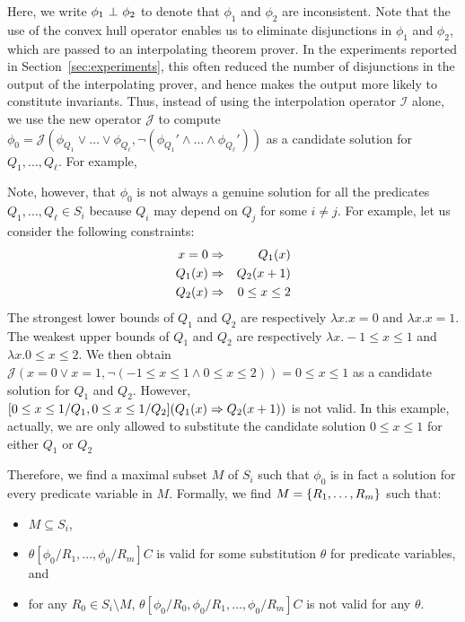 Here, we write \(\phi_1 \ \bot\  \phi_2\) to denote that \(\phi_1\) and 
\(\phi_2\) are inconsistent.  Note that the use of the convex hull 
operator enables us to eliminate disjunctions in \(\phi_1\) and 
\(\phi_2\), which are passed to an interpolating theorem prover.
In the experiments reported in Section~\ref{sec:experiments}, this often 
reduced the number of disjunctions in the output of the interpolating 
prover, and hence makes the output more likely to constitute invariants.
%
Thus, instead of using the interpolation operator \(\mathcal{I}\) alone, 
we use the new operator \(\mathcal{J}\) to compute \(\phi_0 = 
\mathcal{J}(\phi_{Q_1} \lor \dots \lor \phi_{Q_{\ell}},\neg (\phi_{Q_1}' 
\land \dots \land \phi_{Q_{\ell}}'))\) as a candidate solution for 
\(Q_1,\dots,Q_{\ell}\).  For example, \todo{}

Note, however, that \(\phi_0\) is not always a genuine solution for all 
the predicates \(Q_1,\dots,Q_{\ell} \in S_i\) because \(Q_i\) may depend 
on \(Q_j\) for some \(i \neq j\).  For example, let us consider the 
following constraints:
\begin{eqnarray*}
x=0 &\Rightarrow& Q_1(x) \\
Q_1(x) &\Rightarrow& Q_2(x+1) \\
Q_2(x) &\Rightarrow& 0 \leq x \leq 2
\end{eqnarray*}
The strongest lower bounds of \(Q_1\) and \(Q_2\) are respectively 
\(\lambda x.x=0\) and \(\lambda x.x=1\).  The weakest upper bounds of 
\(Q_1\) and \(Q_2\) are respectively \(\lambda x.-1 \leq x \leq 1\) and 
\(\lambda x.0 \leq x \leq 2\).  We then obtain \(\mathcal{J}(x=0 \lor 
x=1,\neg (-1 \leq x \leq 1 \land 0 \leq x \leq 2))=0 \leq x \leq 1\) as 
a candidate solution for \(Q_1\) and \(Q_2\).  However, \([0 \leq x \leq 
1/Q_1,0 \leq x \leq 1/Q_2](Q_1(x) \Rightarrow Q_2(x+1))\) is not valid.  In 
this example, actually, we are only allowed to substitute the candidate 
solution \(0 \leq x \leq 1\) for either \(Q_1\) or \(Q_2\)



Therefore, we find a maximal subset \(M\) of \(S_i\) such that \(\phi_0\) 
is in fact a solution for every predicate variable in \(M\).  Formally, 
we find \(M=\{{R_1,\dots,R_m}\}\) such that:
\begin{itemize}
\item \(M \subseteq S_i\),
\item \(\theta[\phi_0/R_1,\dots,\phi_0/R_m]C\) is valid for some 
substitution \(\theta\) for predicate variables, and
\item for any \(R_0 \in S_i \setminus M\), 
\(\theta[\phi_0/R_0,\phi_0/R_1,\dots,\phi_0/R_m]C\) is not valid for any 
\(\theta\).
\end{itemize}

